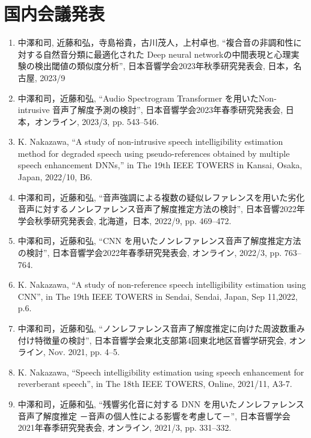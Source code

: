 \documentclass[uplatex,dvipdfmx,a4paper,11pt]{jsreport}
\begin{document}
\section*{国内会議発表}
\begin{enumerate}

\item 中澤和司, 近藤和弘，寺島裕貴，古川茂人，上村卓也, “複合音の非調和性に対する自然音分類に最適化された Deep neural networkの中間表現と心理実験の検出閾値の類似度分析”, 日本音響学会2023年秋季研究発表会, 日本，名古屋, 2023/9

\item 中澤和司，近藤和弘, “Audio Spectrogram Transformer を用いたNon-intrusive 音声了解度予測の検討”, 日本音響学会2023年春季研究発表会, 日本，オンライン, 2023/3, pp. 543–546.

\item K. Nakazawa, “A study of non-intrusive speech intelligibility estimation method for degraded speech using pseudo-references obtained by multiple speech enhancement DNNs,” in The 19th IEEE TOWERS in Kansai, Osaka, Japan, 2022/10, B6.

\item 中澤和司，近藤和弘, “音声強調による複数の疑似レファレンスを用いた劣化音声に対するノンレファレンス音声了解度推定方法の検討”, 日本音響2022年学会秋季研究発表会, 北海道，日本, 2022/9, pp. 469–472.

\item 中澤和司，近藤和弘, “CNN を用いたノンレファレンス音声了解度推定方法の検討”, 日本音響学会2022年春季研究発表会, オンライン, 2022/3, pp. 763–764.

\item K. Nakazawa, “A study of non-reference speech intelligibility estimation using CNN”, in The 19th IEEE TOWERS in Sendai, Sendai, Japan, Sep 11,2022, p.6.

\item 中澤和司，近藤和弘, “ノンレファレンス音声了解度推定に向けた周波数重み付け特徴量の検討”, 日本音響学会東北支部第4回東北地区音響学研究会, オンライン, Nov. 2021, pp. 4–5.

\item K. Nakazawa, “Speech intelligibility estimation using speech enhancement for reverberant speech”, in The 18th IEEE TOWERS, Online, 2021/11, A3-7.

\item 中澤和司，近藤和弘, “残響劣化音に対する DNN を用いたノンレファレンス音声了解度推定 －音声の個人性による影響を考慮して－”,  日本音響学会2021年春季研究発表会, オンライン, 2021/3, pp. 331–332.


\end{enumerate}
\end{document}
